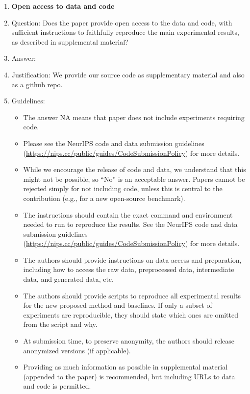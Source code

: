 \documentclass{article}
\theoremstyle{plain}
\theoremstyle{definition}
\theoremstyle{remark}
\begin{document}
\begin{enumerate}
\item {\bf Open access to data and code}
    \item[] Question: Does the paper provide open access to the data and code, with sufficient instructions to faithfully reproduce the main experimental results, as described in supplemental material?
    \item[] Answer: \answerYes{} %
    \item[] Justification: 
     We provide our source code as supplementary material and also as a github repo.
    \item[] Guidelines:
    \begin{itemize}
        \item The answer NA means that paper does not include experiments requiring code.
        \item Please see the NeurIPS code and data submission guidelines (\url{https://nips.cc/public/guides/CodeSubmissionPolicy}) for more details.
        \item While we encourage the release of code and data, we understand that this might not be possible, so “No” is an acceptable answer. Papers cannot be rejected simply for not including code, unless this is central to the contribution (e.g., for a new open-source benchmark).
        \item The instructions should contain the exact command and environment needed to run to reproduce the results. See the NeurIPS code and data submission guidelines (\url{https://nips.cc/public/guides/CodeSubmissionPolicy}) for more details.
        \item The authors should provide instructions on data access and preparation, including how to access the raw data, preprocessed data, intermediate data, and generated data, etc.
        \item The authors should provide scripts to reproduce all experimental results for the new proposed method and baselines. If only a subset of experiments are reproducible, they should state which ones are omitted from the script and why.
        \item At submission time, to preserve anonymity, the authors should release anonymized versions (if applicable).
        \item Providing as much information as possible in supplemental material (appended to the paper) is recommended, but including URLs to data and code is permitted.
    \end{itemize}



\end{enumerate}
\end{document}
